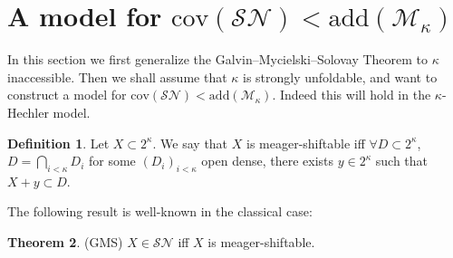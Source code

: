 \documentclass[12pt,a4paper]{scrartcl}
\theoremstyle{definition}
\newtheorem{definition}{Definition}[section]
\newtheorem{theorem}[definition]{Theorem}
\numberwithin{equation}{section}
\begin{document}
\section{A model for $\text{cov}(\mathcal{SN}) < \text{add}(\mathcal{M}_\kappa)$}

In this section we first generalize the Galvin–Mycielski–Solovay Theorem to $\kappa$ inaccessible. Then we shall assume that $\kappa$ is strongly unfoldable, and want to construct a model for $\text{cov}(\mathcal{SN}) < \text{add}(\mathcal{M}_\kappa)$. Indeed this will hold in the $\kappa$-Hechler model.

\begin{definition}
Let $X \subset 2^\kappa$. We say that $X$ is meager-shiftable iff $\forall D \subset 2^\kappa$, $D= \bigcap_{i<\kappa} D_i$ for some $(D_i)_{i<\kappa}$ open dense, there exists $y \in 2^\kappa$ such that $X + y \subset D$.
\end{definition}

The following result is well-known in the classical case:

\begin{theorem} \label{T3}
{(GMS)} $X \in \mathcal{SN}$ iff $X$ is meager-shiftable.
\end{theorem}
\end{document}

